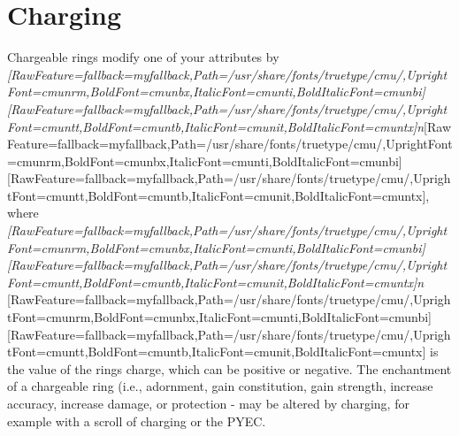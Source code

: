 \section{Charging}
\label{5}
Chargeable rings modify one of your attributes\footnotemark[103] by {\itshape \allowbreak{}\setmainfont{cmunti.ttf}[RawFeature={fallback=myfallback},Path=/usr/share/fonts/truetype/cmu/,UprightFont=cmunrm,BoldFont=cmunbx,ItalicFont=cmunti,BoldItalicFont=cmunbi]\setmonofont{cmunti.ttf}[RawFeature={fallback=myfallback},Path=/usr/share/fonts/truetype/cmu/,UprightFont=cmuntt,BoldFont=cmuntb,ItalicFont=cmunit,BoldItalicFont=cmuntx]\itshape n}\allowbreak{}\setmainfont{cmunrm.ttf}[RawFeature={fallback=myfallback},Path=/usr/share/fonts/truetype/cmu/,UprightFont=cmunrm,BoldFont=cmunbx,ItalicFont=cmunti,BoldItalicFont=cmunbi]\setmonofont{cmunrm.ttf}[RawFeature={fallback=myfallback},Path=/usr/share/fonts/truetype/cmu/,UprightFont=cmuntt,BoldFont=cmuntb,ItalicFont=cmunit,BoldItalicFont=cmuntx], where {\itshape \allowbreak{}\setmainfont{cmunti.ttf}[RawFeature={fallback=myfallback},Path=/usr/share/fonts/truetype/cmu/,UprightFont=cmunrm,BoldFont=cmunbx,ItalicFont=cmunti,BoldItalicFont=cmunbi]\setmonofont{cmunti.ttf}[RawFeature={fallback=myfallback},Path=/usr/share/fonts/truetype/cmu/,UprightFont=cmuntt,BoldFont=cmuntb,ItalicFont=cmunit,BoldItalicFont=cmuntx]\itshape n}{$\text{ }$}\allowbreak{}\setmainfont{cmunrm.ttf}[RawFeature={fallback=myfallback},Path=/usr/share/fonts/truetype/cmu/,UprightFont=cmunrm,BoldFont=cmunbx,ItalicFont=cmunti,BoldItalicFont=cmunbi]\setmonofont{cmunrm.ttf}[RawFeature={fallback=myfallback},Path=/usr/share/fonts/truetype/cmu/,UprightFont=cmuntt,BoldFont=cmuntb,ItalicFont=cmunit,BoldItalicFont=cmuntx] is the value of the ring\textquotesingle{}s charge, which can be positive or negative. The enchantment\footnotemark[104] of a chargeable ring (i.e., adornment, gain constitution, gain strength, increase accuracy, increase damage, or protection -{} may be altered by charging\footnotemark[105], for example with a scroll of charging\footnotemark[106] or the PYEC\footnotemark[107].


